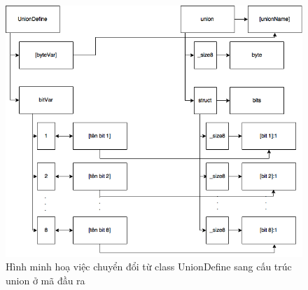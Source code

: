 \begin{figure}
	\centering
	\includegraphics[width=0.7\linewidth]{image/unionDefineMapping}
	\caption{Hình minh hoạ việc chuyển đổi từ class UnionDefine sang cấu trúc union ở mã đầu ra}
	\label{fig:uniondefinemapping}
\end{figure}

